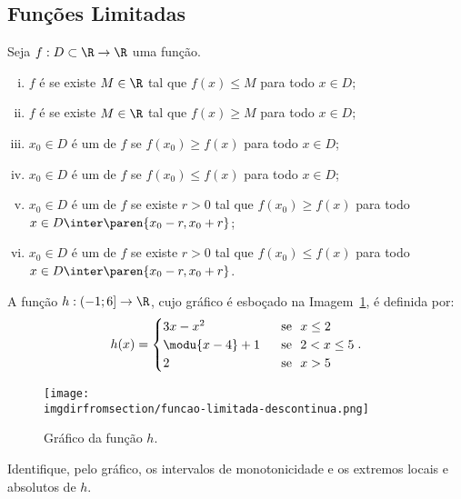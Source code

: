 \subsection{Funções Limitadas}

\begin{definition}
    Seja $f: D \subset \R \to \R$ uma função.
\begin{enumerate}[(i)]
  \item $f$ é  se existe $M \in \R$ tal
  que $f(x) \leq M$ para todo $x \in D$;
  \item $f$ é  se existe $M \in \R$ tal
  que $f(x) \geq M$ para todo $x \in D$;
  \item $x_0 \in D$ é um  de $f$ se
  $f(x_0) \geq f(x)$ para todo $x \in D$;
  \item $x_0 \in D$ é um  de $f$ se
  $f(x_0) \leq f(x)$ para todo $x \in D$;
  \item $x_0 \in D$ é um  de $f$ se
  existe $r>0$ tal que $f(x_0) \geq f(x)$ para todo $x \in D \inter \paren{x_0 - r , x_0+r}$;
  \item $x_0 \in D$ é um  de $f$ se
  existe $r>0$ tal que $f(x_0) \leq f(x)$ para todo $x \in D \inter \paren{x_0 - r ,
  x_0+r}$.
\end{enumerate}
\end{definition}

\begin{example}
    A função $h : \left( -1 ; 6 \right] \to \R$, cujo gráfico é esboçado
na Imagem~\ref{img:funcao-limitada-descontinua}, é definida por:
%
$$h(x) = \begin{cases}
                                3x-x^2 & \ \text{ se } \ x\leq 2 \\
                                \modu{x-4} +1 & \ \text{ se } \ 2 < x \leq 5 \\
                                2 & \ \text{ se } \ x > 5 \\
                                \end{cases}.$$
%
\begin{figure}[H]
    \centering
    \texttt{[image: \\imgdirfromsection/funcao-limitada-descontinua.png]}
    \caption{Gráfico da função $h$.}
    \label{img:funcao-limitada-descontinua}
\end{figure}
%
Identifique, pelo gráfico, os intervalos de monotonicidade e os extremos locais e absolutos de $h$.
\end{example}

